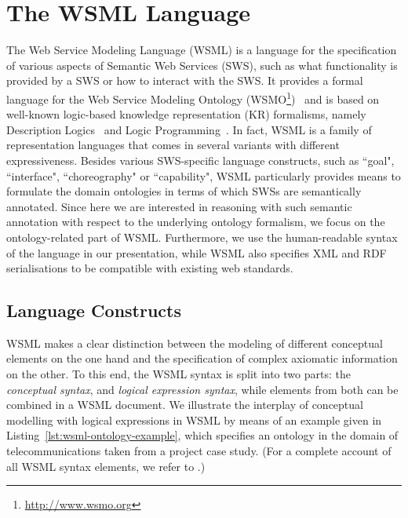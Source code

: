\newcommand{\concept}[1]{\wsmlname{#1}}
\newcommand{\attribute}[1]{\wsmlname{#1}}
\newcommand{\instance}[1]{\wsmlname{#1}}

\section{The WSML Language}\label{sec:wsml}
The Web Service Modeling Language (WSML) \cite{wsml} is a language
for the specification of various aspects of Semantic Web Services
(SWS), such as what functionality is provided by a SWS or how to
interact with the SWS. It provides a formal language for the Web
Service Modeling Ontology
(WSMO\footnote{\url{http://www.wsmo.org}})~\cite{roman05:_web_servic_model_ontol}
and is based on well-known logic-based knowledge representation
(KR) formalisms, namely Description
Logics~\cite{Baader+CalvaneseETAL-DescLogiHand:03} and Logic
Programming~\cite{lloyd-FoundationsOfLP}. In fact, WSML is a
family of representation languages that comes in several variants
with different expressiveness. Besides various SWS-specific
language constructs, such as ``goal", ``interface",
``choreography" or ``capability", WSML particularly provides means
to formulate the domain ontologies in terms of which SWSs are
semantically annotated. Since here we are interested in reasoning
with such semantic annotation with respect to the underlying
ontology formalism, we focus on the ontology-related part of WSML.
Furthermore, we use the human-readable syntax of the language in
our presentation, while WSML also specifies XML and RDF
serialisations to be compatible with existing web standards.

\subsection{Language Constructs}
WSML makes a clear distinction between the modeling of different
conceptual elements on the one hand and the specification of
complex axiomatic information on the other. To this end, the WSML
syntax is split into two parts: the \emph{conceptual syntax},  and
\emph{logical expression syntax}, while elements from both can be
combined in a WSML document. We illustrate the interplay of
conceptual modelling with logical expressions in WSML by means of
an example given in Listing~\ref{lst:wsml-ontology-example}, which
specifies an ontology in the domain of telecommunications taken
from a project case study. (For a complete account of all WSML
syntax elements, we refer to \cite{wsml-spec}.)


